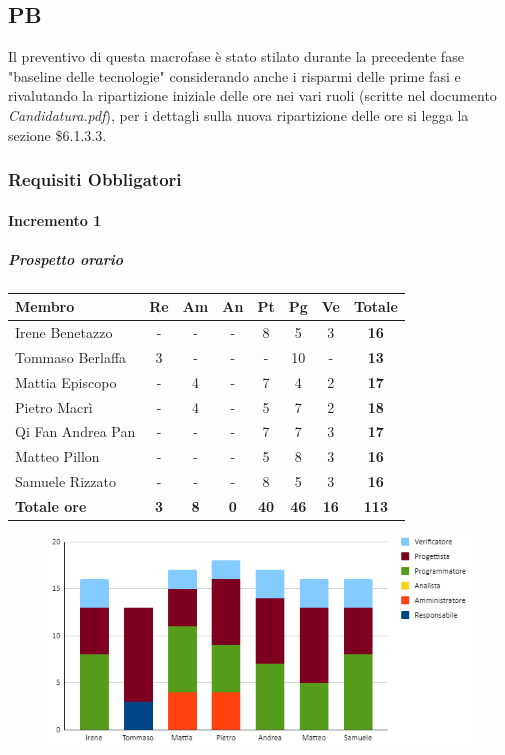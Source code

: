 \subsection{PB}
Il preventivo di questa macrofase è stato stilato durante la precedente fase "baseline delle tecnologie" considerando anche i risparmi delle prime fasi e rivalutando la ripartizione iniziale delle ore nei vari ruoli (scritte nel documento \emph{Candidatura.pdf}), per i dettagli sulla nuova ripartizione delle ore si legga la sezione \$6.1.3.3.
\subsubsection{Requisiti Obbligatori}
\paragraph{Incremento 1}
\subparagraph{Prospetto orario}
\begin{center}
	\renewcommand{\arraystretch}{1.8} %
	\begin{tabular}{ |m{10em}|c|c|c|c|c|c|c| }
	\hline
	\textbf{Membro} & \textbf{Re} & \textbf{Am} &  \textbf{An} &  \textbf{Pt} &  \textbf{Pg} &  \textbf{Ve} &  \textbf{Totale}\\
    \hline
    Irene Benetazzo   & - & - & - & 8 & 5 & 3 & \textbf{16} \\
    \hline
    Tommaso Berlaffa  & 3 & - & - & - & 10 & - & \textbf{13} \\
    \hline
    Mattia Episcopo   & - & 4 & - & 7 & 4 & 2 & \textbf{17} \\
    \hline
    Pietro Macrì      & - & 4 & - & 5 & 7 & 2 & \textbf{18} \\
    \hline
    Qi Fan Andrea Pan & - & - & - & 7 & 7 & 3 & \textbf{17} \\
    \hline
    Matteo Pillon     & - & - & - & 5 & 8 & 3 & \textbf{16} \\
    \hline
    Samuele Rizzato   & - & - & - & 8 & 5 & 3 & \textbf{16} \\
    \hline
    \textbf{Totale ore} & \textbf{3} & \textbf{8} &  \textbf{0} &  \textbf{40} &  \textbf{46} &  \textbf{16} &  \textbf{113}\\
    \hline
	\end{tabular}
\end{center}
\begin{figure}[H]
   \centering\includegraphics{images/preventivo/PB-incremento1-ore.png}
\end{figure}


